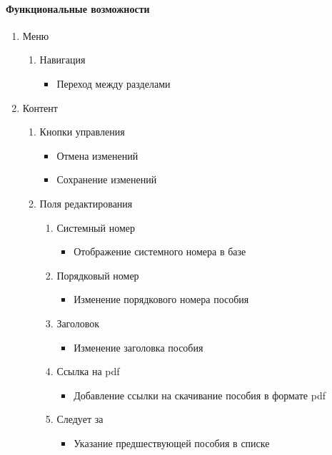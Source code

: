 \paragraph{Функциональные возможности}
\begin{enumerate}
	\item Меню
	\begin{enumerate}
		\item Навигация
		\begin{itemize}
			\item Переход между разделами
		\end{itemize}
	\end{enumerate}

	\item Контент
	\begin{enumerate}
		\item Кнопки управления
		\begin{itemize}
			\item Отмена изменений
			\item Сохранение изменений
		\end{itemize}

		\item Поля редактирования
		\begin{enumerate}
			\item Системный номер
			\begin{itemize}
				\item Отображение системного номера в базе
			\end{itemize}

			\item Порядковый номер
			\begin{itemize}
				\item Изменение порядкового номера пособия
			\end{itemize}

			\item Заголовок
			\begin{itemize}
				\item Изменение заголовка пособия
			\end{itemize}

			\item Ссылка на pdf
			\begin{itemize}
				\item Добавление ссылки на скачивание пособия в формате pdf
			\end{itemize}

			\item Следует за
			\begin{itemize}
				\item Указание предшествующей пособия в списке
			\end{itemize}


\end{enumerate}
\end{enumerate}
\end{enumerate}
